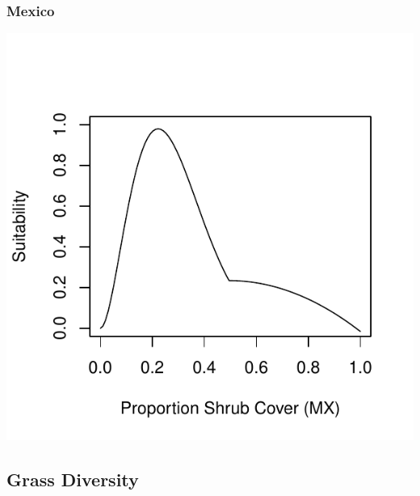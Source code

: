 \documentclass[12pt,letterpaper]{article}\usepackage{graphicx, color}
\makeatletter
\def\maxwidth{ %
  \ifdim\Gin@nat@width>\linewidth
    \linewidth
  \else
    \Gin@nat@width
  \fi
}
\newenvironment{knitrout}{}{} %
\makeatother
\begin{document}
\subsubsection{Mexico}
\begin{knitrout}
\color{fgcolor}\includegraphics[width=\maxwidth]{figure/Goodwin_Shrub_Cover_MX} 
\end{knitrout}

\subsection{Grass Diversity}
\end{document}

